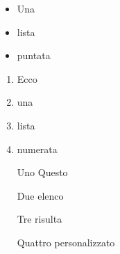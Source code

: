 \begin{itemize}
  \item Una
  \item lista
  \item puntata
\end{itemize}


\begin{enumerate}
  \item Ecco
  \item una
  \item lista
  \item numerata
\end{enumerate}


\begin{itemize}
 \item[Uno] Questo
 \item[Due] elenco
 \item[Tre] risulta
 \item[Quattro] personalizzato
\end{itemize}

